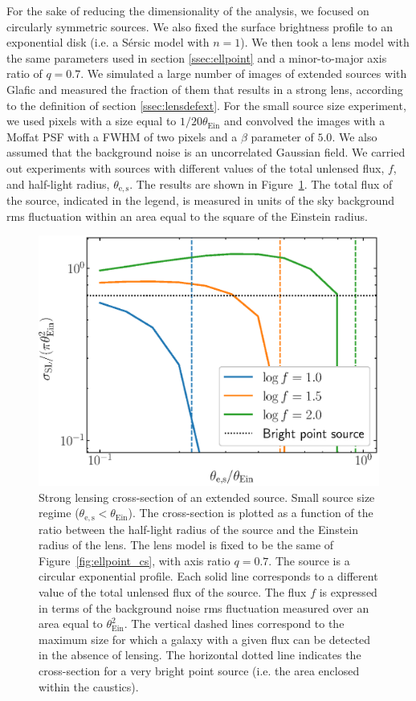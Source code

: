 \documentclass{aa}
\def\tein{\theta_{\mathrm{Ein}}}
\def\Fref#1{Figure~\ref{#1}\xspace}
\begin{document}
For the sake of reducing the dimensionality of the analysis, we focused on circularly symmetric sources. We also fixed the surface brightness profile to an exponential disk (i.e. a S\'{e}rsic model with $n=1$).
We then took a lens model with the same parameters used in section \ref{ssec:ellpoint} and a minor-to-major axis ratio of $q=0.7$.
We simulated a large number of images of extended sources with {\sc Glafic} and measured the fraction of them that results in a strong lens, according to the definition of section \ref{ssec:lensdefext}.
For the small source size experiment, we used pixels with a size equal to $1/20\tein$ and convolved the images with a Moffat PSF with a FWHM of two pixels and a $\beta$ parameter of $5.0$.
We also assumed that the background noise is an uncorrelated Gaussian field.
We carried out experiments with sources with different values of the total unlensed flux, $f$, and half-light radius, $\theta_{\mathrm{e,s}}$.
The results are shown in \Fref{fig:extcs}.
The total flux of the source, indicated in the legend, is measured in units of the sky background rms fluctuation within an area equal to the square of the Einstein radius.

\begin{figure}
\includegraphics[width=\columnwidth]{ell_ext_cs.eps}
\caption{
Strong lensing cross-section of an extended source.
Small source size regime ($\theta_{\mathrm{e,s}} < \tein$).
The cross-section is plotted as a function of the ratio between the half-light radius of the source and the Einstein radius of the lens.
The lens model is fixed to be the same of \Fref{fig:ellpoint_cs}, with axis ratio $q=0.7$. The source is a circular exponential profile.
Each solid line corresponds to a different value of the total unlensed flux of the source. The flux $f$ is expressed in terms of the background noise rms fluctuation measured over an area equal to $\tein^2$.
The vertical dashed lines correspond to the maximum size for which a galaxy with a given flux can be detected in the absence of lensing.
The horizontal dotted line indicates the cross-section for a very bright point source (i.e. the area enclosed within the caustics).
\label{fig:extcs}
}
\end{figure}
\end{document}
